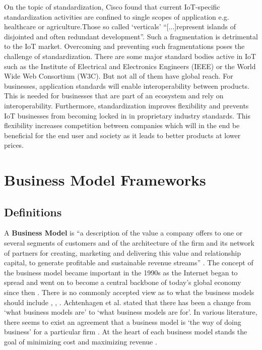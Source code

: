 			
			On the topic of standardization, Cisco found that current IoT-specific standardization activities are confined to single scopes of application e.g. healthcare or agriculture.Those so called `verticals' ``[...]represent islands of disjointed and often redundant development''\cite[p.18]{cisco}. Such a fragmentation is detrimental to the IoT market. Overcoming and preventing such fragmentations poses the challenge of standardization. There are some major standard bodies active in IoT such as the Institute of Electrical and Electronics Engineers (IEEE) or the World Wide Web Consortium (W3C). But not all of them have global reach. For businesses, application standards will enable interoperability between products. This is needed for businesses that are part of an ecosystem and rely on interoperability. Furthermore, standardization improves flexibility and prevents IoT businesses from becoming locked in in proprietary industry standards. This flexibility increases competition between companies which will in the end be beneficial for the end user and society as it leads to better products at lower prices.
		

\section{Business Model Frameworks}
\label{sec:bmf}	
	\subsection{Definitions} 
		 A \textbf{Business Model} is ``a description of the value a company offers to one or several segments of customers and of the architecture of the firm and its network of partners for creating, marketing and delivering this value and relationship capital, to generate profitable and sustainable revenue streams'' \cite{osterwalder2005}. The concept of the business model became important in the 1990s as the Internet began to spread and went on to become a central backbone of today's global economy since then \cite{zott}. There is no commonly accepted view as to what the business models should include \cite{morris}, \cite{osterwalder2005}, \cite{schweizer}. Achtenhagen et al. \cite{achtenhagen} stated that there has been a change from `what business models are' to `what business models are for'. In various literature, there seems to exist an agreement that a business model is `the way of doing business' for a particular firm \cite{westerlund}. At the heart of each business model stands the goal of minimizing cost and maximizing revenue \cite{ju}.

